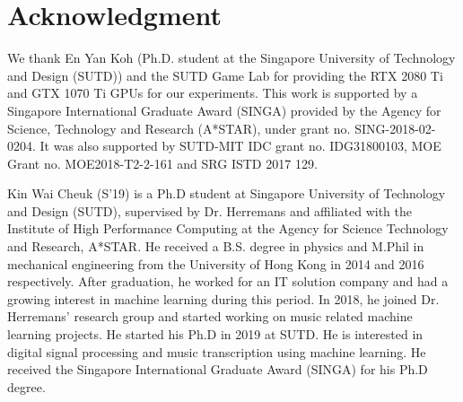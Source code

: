 \documentclass{ieeeaccess}
\begin{document}


\section*{Acknowledgment}
We thank En Yan Koh (Ph.D. student at the Singapore University of Technology and Design (SUTD)) and the SUTD Game Lab for providing the RTX 2080 Ti and GTX 1070 Ti GPUs for our experiments. This work is supported by a Singapore International Graduate Award (SINGA) provided by the Agency for Science, Technology and Research (A*STAR), under grant no. SING-2018-02-0204. It was also supported by SUTD-MIT IDC grant no. IDG31800103, MOE Grant no. MOE2018-T2-2-161 and SRG ISTD 2017 129.





\vfill\pagebreak


\begin{IEEEbiography}{Kin Wai Cheuk} (S'19) is a Ph.D student at Singapore University of Technology and Design (SUTD), supervised by Dr. Herremans and affiliated with the Institute of High Performance Computing at the Agency for Science Technology and Research, A*STAR. He received a B.S. degree in physics and M.Phil in mechanical engineering from the University of Hong Kong in 2014 and 2016 respectively. After graduation, he worked for an IT solution company and had a growing interest in machine learning during this period. In 2018, he joined Dr. Herremans' research group and started working on music related machine learning projects. He started his Ph.D in 2019 at SUTD. He is interested in digital signal processing and music transcription using machine learning. He received the Singapore International Graduate Award (SINGA) for his Ph.D degree.
\end{IEEEbiography}
\end{document}
